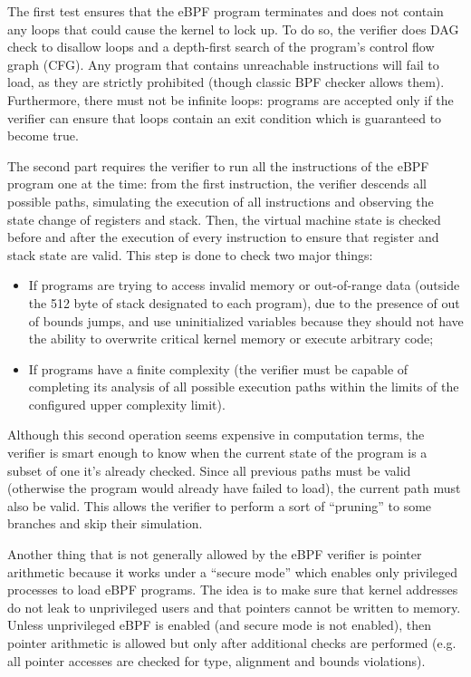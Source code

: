 The first test ensures that the eBPF program terminates and does not contain any loops that could cause the kernel to lock up. 
To do so, the verifier does DAG check to disallow loops and a depth-first search of the program's control flow graph (CFG). 
Any program that contains unreachable instructions will fail to load, as they are strictly prohibited (though classic BPF checker allows them).
Furthermore, there must not be infinite loops: programs are accepted only if the verifier can ensure that loops contain an exit condition which is guaranteed to become true.

The second part requires the verifier to run all the instructions of the eBPF program one at the time: from the first instruction, the verifier descends all possible paths, simulating the execution of all instructions and observing the state change of registers and stack.
Then, the virtual machine state is checked before and after the execution of every instruction to ensure that register and stack state are valid. 
This step is done to check two major things: 

\begin{itemize}
	\item If programs are trying to access invalid memory or out-of-range data
		(outside the 512 byte of stack designated to each program), due to	the presence of out of bounds jumps, and use uninitialized variables because they should not have the ability to overwrite critical kernel memory or execute arbitrary code;
	\item If programs have a finite complexity (the verifier must be capable of
		completing its analysis of all possible execution paths within the limits of the configured upper complexity limit).
\end{itemize}

Although this second operation seems expensive in computation terms, the verifier is smart enough to know when the current state of the program is a subset of one it's already checked. 
Since all previous paths must be valid (otherwise the program would already have failed to load), the current path must also be valid. 
This allows the verifier to perform a sort of ``pruning'' to some branches and skip their simulation.

Another thing that is not generally allowed by the eBPF verifier is pointer arithmetic because it works under a ``secure mode'' which enables only privileged processes to load eBPF programs.
The idea is to make sure that kernel addresses do not leak to unprivileged users and that pointers cannot be written to memory. 
Unless unprivileged eBPF is enabled (and secure mode is not enabled), then pointer arithmetic is allowed but only after additional checks are performed (e.g. all pointer accesses are checked for type, alignment and bounds violations).

